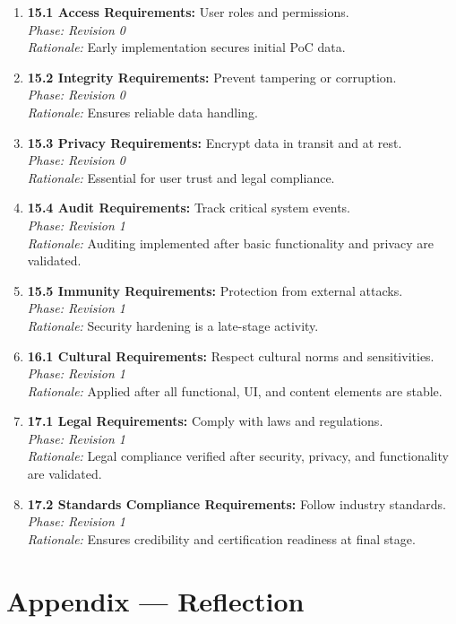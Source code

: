 \documentclass[11pt]{article}
\begin{document}
\begin{enumerate}
    \item \textbf{15.1 Access Requirements:} User roles and permissions.\\
    \textit{Phase: Revision 0} \\
    \textit{Rationale:} Early implementation secures initial PoC data.

    \item \textbf{15.2 Integrity Requirements:} Prevent tampering or corruption.\\
    \textit{Phase: Revision 0} \\
    \textit{Rationale:} Ensures reliable data handling.

    \item \textbf{15.3 Privacy Requirements:} Encrypt data in transit and at rest.\\
    \textit{Phase: Revision 0} \\
    \textit{Rationale:} Essential for user trust and legal compliance.

    \item \textbf{15.4 Audit Requirements:} Track critical system events.\\
    \textit{Phase: Revision 1} \\
    \textit{Rationale:} Auditing implemented after basic functionality and privacy are validated.

    \item \textbf{15.5 Immunity Requirements:} Protection from external attacks.\\
    \textit{Phase: Revision 1} \\
    \textit{Rationale:} Security hardening is a late-stage activity.

    \item \textbf{16.1 Cultural Requirements:} Respect cultural norms and sensitivities.\\
    \textit{Phase: Revision 1} \\
    \textit{Rationale:} Applied after all functional, UI, and content elements are stable.

    \item \textbf{17.1 Legal Requirements:} Comply with laws and regulations.\\
    \textit{Phase: Revision 1} \\
    \textit{Rationale:} Legal compliance verified after security, privacy, and functionality are validated.

    \item \textbf{17.2 Standards Compliance Requirements:} Follow industry standards.\\
    \textit{Phase: Revision 1} \\
    \textit{Rationale:} Ensures credibility and certification readiness at final stage.
\end{enumerate}


\newpage{}
\section*{Appendix --- Reflection}




\end{document}

